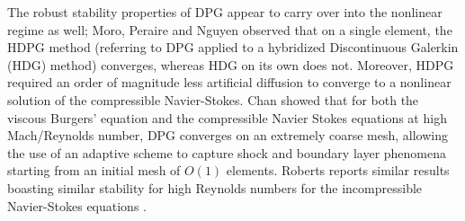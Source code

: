 \documentclass[preprint,12pt]{elsarticle}
\begin{document}
The robust stability properties of DPG appear to carry over into the nonlinear regime as well; Moro, Peraire and Nguyen observed \cite{MoroNguyenPeraire11, MoroMastersThesis} that on a single element, the HDPG method (referring to DPG applied to a hybridized Discontinuous Galerkin (HDG) method) converges, whereas HDG on its own does not.  Moreover, HDPG required an order of magnitude less artificial diffusion to converge to a nonlinear solution of the compressible Navier-Stokes.  Chan \etal \cite{Chan2013dpg} showed that for both the viscous Burgers' equation and the compressible Navier Stokes equations at high Mach/Reynolds number, DPG converges on an extremely coarse mesh, allowing the use of an adaptive scheme to capture shock and boundary layer phenomena starting from an initial mesh of $O(1)$ elements.  Roberts reports similar results boasting similar stability for high Reynolds numbers for the incompressible Navier-Stokes equations \cite{NateDissertation}.  




\end{document}
